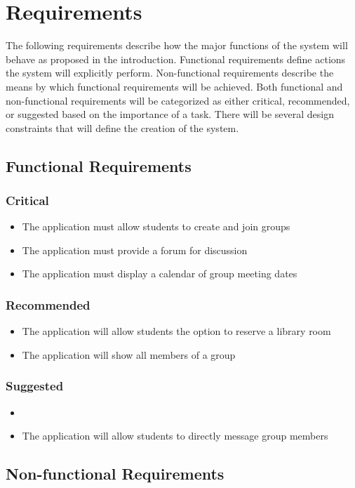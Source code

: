 \chapter{Requirements}
The following requirements describe how the major functions of the system will behave as proposed in the introduction. Functional requirements define actions the system will explicitly perform. Non-functional requirements describe the means by which functional requirements will be achieved. Both functional and non-functional requirements will be categorized as either critical, recommended, or suggested based on the importance of a task. There will be several design constraints that will define the creation of the system.

\section{Functional Requirements}
\subsection{Critical}
	\begin{itemize}
		\item The application must allow students to create and join groups
		\item The application must provide a forum for discussion
		\item The application must display a calendar of group meeting dates
	\end{itemize}
\subsection{Recommended}
	\begin{itemize}
		\item The application will allow students the option to reserve a library room
		\item The application will show all members of a group
	\end{itemize}
\subsection{Suggested}
	\begin{itemize}
		\item 
		\item The application will allow students to directly message group members
	\end{itemize}

\section{Non-functional Requirements}
